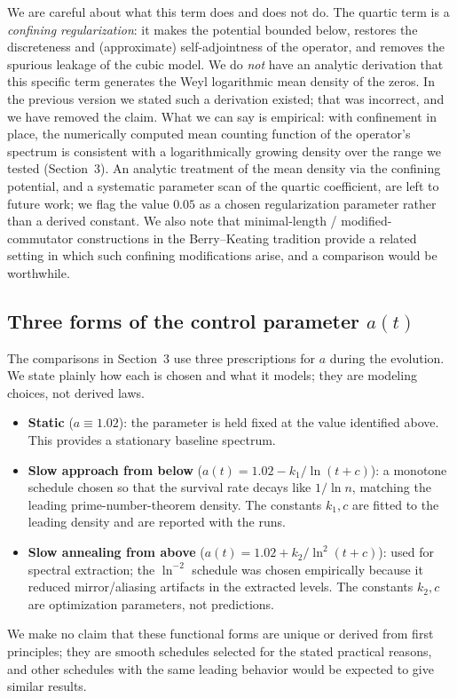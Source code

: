 \documentclass[11pt]{article}
\begin{document}
We are careful about what this term does and does not do. The quartic term is a \emph{confining regularization}: it makes the potential bounded below, restores the discreteness and (approximate) self-adjointness of the operator, and removes the spurious leakage of the cubic model. We do \emph{not} have an analytic derivation that this specific term generates the Weyl logarithmic mean density of the zeros. In the previous version we stated such a derivation existed; that was incorrect, and we have removed the claim. What we can say is empirical: with confinement in place, the numerically computed mean counting function of the operator's spectrum is consistent with a logarithmically growing density over the range we tested (Section~3). An analytic treatment of the mean density via the confining potential, and a systematic parameter scan of the quartic coefficient, are left to future work; we flag the value $0.05$ as a chosen regularization parameter rather than a derived constant. We also note that minimal-length / modified-commutator constructions in the Berry--Keating tradition \cite{bishop2019} provide a related setting in which such confining modifications arise, and a comparison would be worthwhile.

\subsection{Three forms of the control parameter $a(t)$}

The comparisons in Section~3 use three prescriptions for $a$ during the evolution. We state plainly how each is chosen and what it models; they are modeling choices, not derived laws.
\begin{itemize}
\item \textbf{Static} ($a \equiv 1.02$): the parameter is held fixed at the value identified above. This provides a stationary baseline spectrum.
\item \textbf{Slow approach from below} ($a(t) = 1.02 - k_1/\ln(t+c)$): a monotone schedule chosen so that the survival rate decays like $1/\ln n$, matching the leading prime-number-theorem density. The constants $k_1, c$ are fitted to the leading density and are reported with the runs.
\item \textbf{Slow annealing from above} ($a(t) = 1.02 + k_2/\ln^2(t+c)$): used for spectral extraction; the $\ln^{-2}$ schedule was chosen empirically because it reduced mirror/aliasing artifacts in the extracted levels. The constants $k_2, c$ are optimization parameters, not predictions.
\end{itemize}
We make no claim that these functional forms are unique or derived from first principles; they are smooth schedules selected for the stated practical reasons, and other schedules with the same leading behavior would be expected to give similar results.
\end{document}
